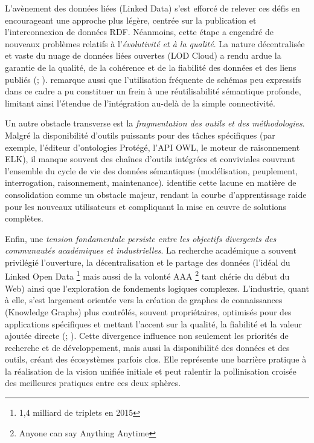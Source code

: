 \documentclass[9pt,twocolumn,twoside,french]{opticajnl}
\begin{document}
L'avènement des données liées (Linked Data) s'est efforcé de relever ces défis en encourageant une approche plus légère, centrée sur la publication et l'interconnexion de données RDF. Néanmoins, cette étape a engendré de nouveaux problèmes relatifs à l'\textit{évolutivité et à la qualité}. La nature décentralisée et vaste du nuage de données liées ouvertes (LOD Cloud) a rendu ardue la garantie de la qualité, de la cohérence et de la fiabilité des données et des liens publiés (\citealp{Jain2010}; \citealp{Tanon2014Assessing}). \citet{Hitzler2021} remarque aussi que l'utilisation fréquente de schémas peu expressifs dans ce cadre a pu constituer un frein à une réutilisabilité sémantique profonde, limitant ainsi l'étendue de l'intégration au-delà de la simple connectivité.

Un autre obstacle transverse est la \textit{fragmentation des outils et des méthodologies}. Malgré la disponibilité d'outils puissants pour des tâches spécifiques (par exemple, l'éditeur d'ontologies Protégé, l'API OWL, le moteur de raisonnement ELK), il manque souvent des chaînes d'outils intégrées et conviviales couvrant l'ensemble du cycle de vie des données sémantiques (modélisation, peuplement, interrogation, raisonnement, maintenance). \citet{Hitzler2021} identifie cette lacune en matière de consolidation comme un obstacle majeur, rendant la courbe d'apprentissage raide pour les nouveaux utilisateurs et compliquant la mise en œuvre de solutions complètes.

Enfin, une \textit{tension fondamentale persiste entre les objectifs divergents des communautés académiques et industrielles}. La recherche académique a souvent privilégié l'ouverture, la décentralisation et le partage des données (l'idéal du Linked Open Data \footnote{1,4 milliard de triplets en 2015} mais aussi de la volonté AAA \footnote{Anyone can say Anything Anytime} tant chérie du début du Web) ainsi que l'exploration de fondements logiques complexes. L'industrie, quant à elle, s'est largement orientée vers la création de graphes de connaissances (Knowledge Graphs) plus contrôlés, souvent propriétaires, optimisés pour des applications spécifiques et mettant l'accent sur la qualité, la fiabilité et la valeur ajoutée directe (\citealp{Noy2019Industryscale}; \citealp{Hitzler2021}). Cette divergence influence non seulement les priorités de recherche et de développement, mais aussi la disponibilité des données et des outils, créant des écosystèmes parfois clos. Elle représente une barrière pratique à la réalisation de la vision unifiée initiale et peut ralentir la pollinisation croisée des meilleures pratiques entre ces deux sphères.
\end{document}
